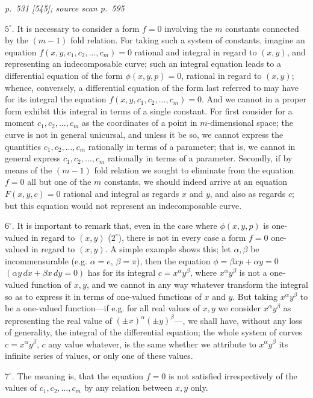 \documentclass[11pt,a4paper]{article}
\newcommand{\sourcepage}[3]{%
  \bigskip
  \noindent\textit{p.~#1 [#2]; source scan p.~#3}%
  \par\smallskip
}
\begin{document}
\sourcepage{531}{545}{595}
$5^\circ$. It is necessary to consider a form $f=0$ involving the $m$ constants connected
by the $(m-1)$ fold relation. For taking such a system of constants, imagine an
equation $f(x,y,c_1,c_2,\ldots,c_m)=0$ rational and integral in regard to $(x,y)$, and representing
an indecomposable curve; such an integral equation leads to a differential equation
of the form $\phi(x,y,p)=0$, rational in regard to $(x,y)$; whence, conversely, a differential
equation of the form last referred to may have for its integral the equation
$f(x,y,c_1,c_2,\ldots,c_m)=0$. And we cannot in a proper form exhibit this integral in terms
of a single constant. For first consider for a moment $c_1,c_2,\ldots,c_m$ as the coordinates
of a point in $m$-dimensional space; the curve is not in general unicursal, and unless
it be so, we cannot express the quantities $c_1,c_2,\ldots,c_m$ rationally in terms of a parameter;
that is, we cannot in general express $c_1,c_2,\ldots,c_m$ rationally in terms of a
parameter. Secondly, if by means of the $(m-1)$ fold relation we sought to eliminate
from the equation $f=0$ all but one of the $m$ constants, we should indeed arrive at
an equation $F(x,y,c)=0$ rational and integral as regards $x$ and $y$, and also as regards
$c$; but this equation would not represent an indecomposable curve.

$6^\circ$. It is important to remark that, even in the case where $\phi(x,y,p)$ is one-valued
in regard to $(x,y)$ ($2^\circ$), there is not in every case a form $f=0$ one-valued
in regard to $(x,y)$. A simple example shows this; let $\alpha,\beta$ be incommensurable
(e.g. $\alpha=e$, $\beta=\pi$), then the equation $\phi=\beta xp+\alpha y=0$ $(\alpha y\,dx+\beta x\,dy=0)$ has for its
integral $c=x^\alpha y^\beta$, where $x^\alpha y^\beta$ is not a one-valued function of $x,y$, and we cannot in
any way whatever transform the integral so as to express it in terms of one-valued
functions of $x$ and $y$. But taking $x^\alpha y^\beta$ to be a one-valued function---if e.g. for all
real values of $x,y$ we consider $x^\alpha y^\beta$ as representing the real value of $(\pm x)^\alpha(\pm y)^\beta$---,
we shall have, without any loss of generality, the integral of the differential equation;
the whole system of curves $c=x^\alpha y^\beta$, $c$ any value whatever, is the same whether we
attribute to $x^\alpha y^\beta$ its infinite series of values, or only one of these values.

$7^\circ$. The meaning is, that the equation $f=0$ is not satisfied irrespectively of the
values of $c_1,c_2,\ldots,c_m$ by any relation between $x,y$ only.
\end{document}
